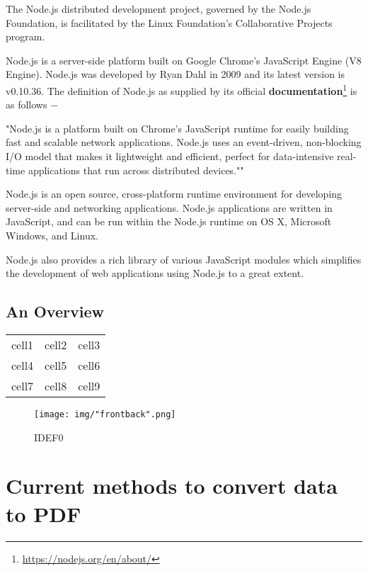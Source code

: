 \documentclass[paper.tex]{subfiles}
\begin{document}
\begin{enumerate}[a.]
  The Node.js distributed development project, governed by the Node.js Foundation, is facilitated by the Linux Foundation's Collaborative Projects program.

  Node.js is a server-side platform built on Google Chrome's JavaScript Engine (V8 Engine). Node.js was developed by Ryan Dahl in 2009 and its latest version is v0.10.36. The definition of Node.js as supplied by its official \textbf{documentation}\footnote{\url{https://nodejs.org/en/about/}} is as follows −

  "Node.js is a platform built on Chrome's JavaScript runtime for easily building fast and scalable network applications. Node.js uses an event-driven, non-blocking I/O model that makes it lightweight and efficient, perfect for data-intensive real-time applications that run across distributed devices.""

  Node.js is an open source, cross-platform runtime environment for developing server-side and networking applications. Node.js applications are written in JavaScript, and can be run within the Node.js runtime on OS X, Microsoft Windows, and Linux.

  Node.js also provides a rich library of various JavaScript modules which simplifies the development of web applications using Node.js to a great extent.
\end{enumerate}

\newpage
\subsection{An Overview}
\begin{center}
\begin{tabular}{ |c|c|c| }
 \hline
 cell1 & cell2 & cell3 \\
 cell4 & cell5 & cell6 \\
 cell7 & cell8 & cell9 \\
 \hline
\end{tabular}
\end{center}

\begin{figure}[H]
\centering
\texttt{[image: img/"frontback".png]}
\caption{IDEF0}
\end{figure}

\section{Current methods to convert data to PDF}
\end{document}
